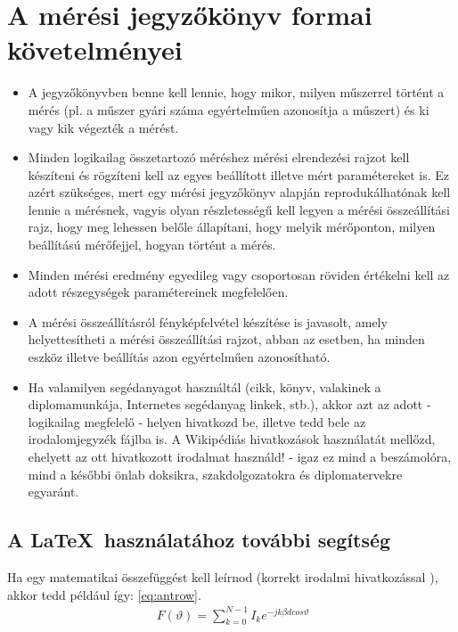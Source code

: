 \section{A mérési jegyzőkönyv formai követelményei}

\begin{itemize}
\item
A jegyzőkönyvben benne kell lennie, hogy mikor, milyen műszerrel történt a mérés (pl. a műszer gyári száma egyértelműen azonosítja a műszert) és ki vagy kik végezték a mérést.
\item
Minden logikailag összetartozó méréshez mérési elrendezési rajzot kell készíteni és rögzíteni kell az egyes beállított illetve mért paramétereket is. Ez azért szükséges, mert egy mérési jegyzőkönyv alapján reprodukálhatónak kell lennie a mérésnek, vagyis olyan részletességű kell legyen a mérési összeállítási rajz, hogy meg lehessen belőle állapítani, hogy melyik mérőponton, milyen beállítású mérőfejjel, hogyan történt a mérés.
\item
Minden mérési eredmény egyedileg vagy csoportosan röviden értékelni kell az adott részegységek paramétereinek megfelelően.
\item
A mérési összeállításról fényképfelvétel készítése is javasolt, amely helyettesítheti a mérési összeállítási rajzot, abban az esetben, ha minden eszköz illetve beállítás azon egyértelműen azonosítható.
\item
Ha valamilyen segédanyagot használtál (cikk, könyv, valakinek a diplomamunkája, Internetes segédanyag linkek, stb.), akkor azt az adott - logikailag megfelelő - helyen hivatkozd be, illetve tedd bele az irodalomjegyzék fájlba is. A Wikipédiás hivatkozások használatát mellőzd, ehelyett az ott hivatkozott irodalmat használd! - igaz ez mind a beszámolóra, mind a későbbi önlab doksikra, szakdolgozatokra és diplomatervekre egyaránt.
\end{itemize}

\subsection{A \LaTeX \ használatához további segítség}

Ha egy matematikai összefüggést kell leírnod (korrekt irodalmi hivatkozással \cite{diploma} ), akkor tedd például így: \ref{eq:antrow}.
\begin{align}
\ F ( \vartheta )= \sum_{k=0}^{N-1} I_k e^{-jk \beta d cos \vartheta} 
\label{eq:antrow}
\end{align}

